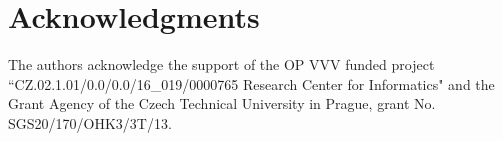 \documentclass[]{spie}  %
\begin{document}
\section{Acknowledgments}
\label{sec:acknowledgments}

The authors acknowledge the support of the OP VVV funded project ``CZ.02.1.01/0.0/0.0/16\_019/0000765 Research Center for Informatics" and the Grant Agency of the Czech Technical University in Prague, grant No. SGS20/170/OHK3/3T/13.



\end{document}
